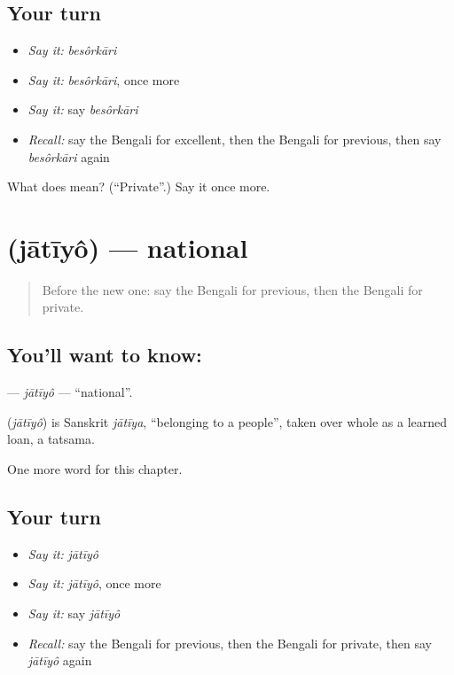 \subsection*{Your turn}
\begin{itemize}
\raggedright
  \item \emph{Say it:} \emph{besôrkāri}
  \item \emph{Say it:} \emph{besôrkāri}, once more
  \item \emph{Say it:} say \emph{besôrkāri}
  \item \emph{Recall:} say the Bengali for excellent, then the Bengali for previous, then say \emph{besôrkāri} again
\end{itemize}

\begin{tcolorbox}[breakable,colback=teal!4,colframe=teal!35!black,title={Before you move on}]
What does  mean? (\textquotedblleft{}Private\textquotedblright{}.) Say it once more.
\end{tcolorbox}
\section[\texorpdfstring{\bn{জাতীয়} (jātīyô)}{জাতীয় (jātīyô)}]{ (jātīyô) — national}

\label{lesson:BN-C221-jatiyo}



\begin{quote}
Before the new one: say the Bengali for previous, then the Bengali for private.
\end{quote}

\subsection*{You'll want to know: }
\textbf{} — \emph{jātīyô} — \textquotedblleft{}national\textquotedblright{}.

\begin{cousinweb}
\textbf{} (\emph{jātīyô}) is Sanskrit \emph{jātīya}, \textquotedblleft{}belonging to a people\textquotedblright{}, taken over whole as a learned loan, a tatsama.
\end{cousinweb}

\begin{grammarlens}[title={What you've built}]
One more word for this chapter.
\end{grammarlens}

\subsection*{Your turn}
\begin{itemize}
\raggedright
  \item \emph{Say it:} \emph{jātīyô}
  \item \emph{Say it:} \emph{jātīyô}, once more
  \item \emph{Say it:} say \emph{jātīyô}
  \item \emph{Recall:} say the Bengali for previous, then the Bengali for private, then say \emph{jātīyô} again
\end{itemize}

